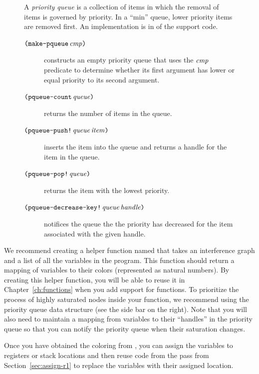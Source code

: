 \documentclass[11pt]{book}
\begin{document}
\begin{figure}
  \small
  \begin{tcolorbox}[title=Priority Queue]
    A \emph{priority queue} is a collection of items in which the
    removal of items is governed by priority. In a ``min'' queue,
    lower priority items are removed first. An implementation is in
     of the support code.   
  \begin{description}
  \item[$\texttt{(}\texttt{make-pqueue}\,\mathit{cmp}\texttt{)}$] constructs an empty
    priority queue that uses the $\mathit{cmp}$ predicate to determine
    whether its first argument has lower or equal priority to its
    second argument.
  \item[$\texttt{(}\texttt{pqueue-count}\,\mathit{queue}\texttt{)}$] returns the number of
    items in the queue.
  \item[$\texttt{(}\texttt{pqueue-push!}\,\mathit{queue}\,\mathit{item}\texttt{)}$] inserts
    the item into the queue and returns a handle for the item in the
    queue.
  \item[$\texttt{(}\texttt{pqueue-pop!}\,\mathit{queue}\texttt{)}$] returns the item with
    the lowest priority.
  \item[$\texttt{(}\texttt{pqueue-decrease-key!}\,\mathit{queue}\,\mathit{handle}\texttt{)}$]
    notifices the queue the the priority has decreased for the item
    associated with the given handle.
  \end{description}
\end{tcolorbox}
\end{figure}

We recommend creating a helper function named  that
takes an interference graph and a list of all the variables in the
program. This function should return a mapping of variables to their
colors (represented as natural numbers). By creating this helper
function, you will be able to reuse it in Chapter~\ref{ch:functions}
when you add support for functions.  To prioritize the process of
highly saturated nodes inside your  function, we
recommend using the priority queue data structure (see the side bar on
the right). Note that you will also need to maintain a mapping from
variables to their ``handles'' in the priority queue so that you can
notify the priority queue when their saturation changes.

Once you have obtained the coloring from , you can
assign the variables to registers or stack locations and then reuse
code from the  pass from
Section~\ref{sec:assign-r1} to replace the variables with their
assigned location.
\end{document}
